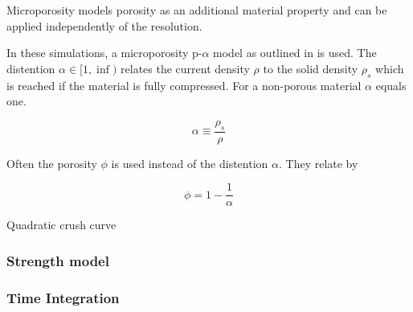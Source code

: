 Microporosity models porosity as an additional material property and can be applied independently of the resolution.


In these simulations, a microporosity p-$\alpha$ model as outlined in \cite{Jutzi_2008} is used. The distention $\alpha \in [1,\inf)$ relates the current density $\rho$ to the solid density $\rho_s$ which is reached if the material is fully compressed. For a non-porous material $\alpha$ equals one.

\begin{equation}
    \alpha \equiv \frac{\rho_s}{\rho}
\end{equation}

Often the porosity $\phi$ is used instead of the distention $\alpha$. They relate by

\begin{equation}
    \phi = 1 - \frac{1}{\alpha}
\end{equation}

Quadratic crush curve
\subsubsection{Strength model}

\subsubsection{Time Integration}